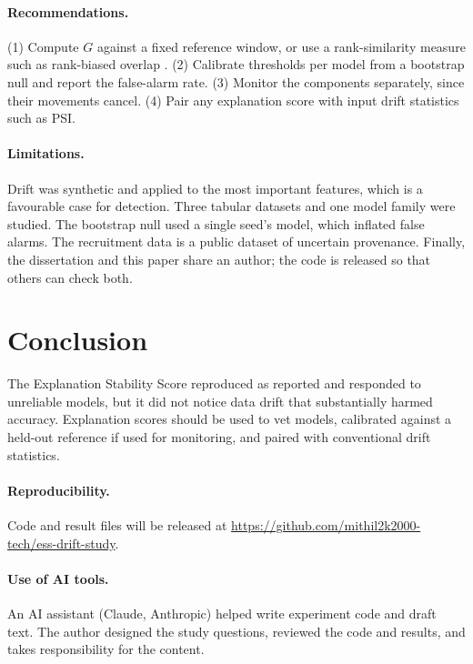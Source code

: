 \documentclass[11pt]{article}
\begin{document}
\paragraph{Recommendations.} (1) Compute \(G\) against a fixed reference window, or use a rank-similarity measure such as rank-biased
overlap \cite{webber2010rbo}. (2) Calibrate thresholds per model from a bootstrap null and report the false-alarm rate. (3) Monitor the
components separately, since their movements cancel. (4) Pair any explanation score with input drift statistics such as PSI.

\paragraph{Limitations.} Drift was synthetic and applied to the most important features, which is a favourable case for detection.
Three tabular datasets and one model family were studied. The bootstrap null used a single seed's model, which inflated false alarms.
The recruitment data is a public dataset of uncertain provenance. Finally, the dissertation and this paper share an author; the code is
released so that others can check both.

\section{Conclusion}
The Explanation Stability Score reproduced as reported and responded to unreliable models, but it did not notice data drift that
substantially harmed accuracy. Explanation scores should be used to vet models, calibrated against a held-out reference if used for
monitoring, and paired with conventional drift statistics.

\paragraph{Reproducibility.} Code and result files will be released at
\newline\url{https://github.com/mithil2k2000-tech/ess-drift-study}.

\paragraph{Use of AI tools.} An AI assistant (Claude, Anthropic) helped write experiment code and draft text. The author designed the
study questions, reviewed the code and results, and takes responsibility for the content.



\end{document}
